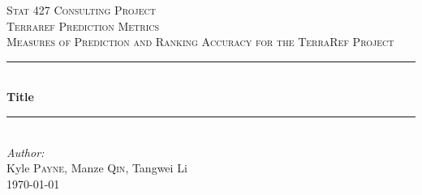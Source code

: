 \begin{titlepage}

\newcommand{\HRule}{\rule{\linewidth}{0.5mm}} %

\center %
 

\textsc{\LARGE Stat 427 Consulting Project}\\[1.5cm] %
\textsc{\Large Terraref Prediction Metrics}\\[0.5cm] %
\textsc{\large Measures of Prediction and Ranking Accuracy for the TerraRef Project}\\[0.5cm] %


\HRule \\[0.4cm]
{ \huge \bfseries Title}\\[0.4cm] %
\HRule \\[1.5cm]
 



\Large \emph{Author:}\\
Kyle \textsc{Payne}, Manze \textsc{Qin}, Tangwei Li  %
\\[3cm] 


{\large \today}\\[2cm] %


 

\vfill %

\end{titlepage}

